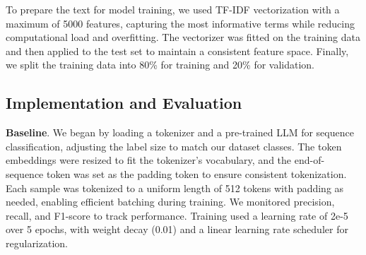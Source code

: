 \documentclass[runningheads]{llncs}
\begin{document}
To prepare the text for model training, we used TF-IDF vectorization with a maximum of 5000 features, capturing the most informative terms while reducing computational load and overfitting. The vectorizer was fitted on the training data and then applied to the test set to maintain a consistent feature space. Finally, we split the training data into 80\% for training and 20\% for validation.



\subsection{Implementation and Evaluation} %

\textbf{Baseline}. We began by loading a tokenizer and a pre-trained LLM for sequence classification, adjusting the label size to match our dataset classes. The token embeddings were resized to fit the tokenizer's vocabulary, and the end-of-sequence token was set as the padding token to ensure consistent tokenization. Each sample was tokenized to a uniform length of 512 tokens with padding as needed, enabling efficient batching during training. We monitored precision, recall, and F1-score to track performance. Training used a learning rate of 2e-5 over 5 epochs, with weight decay (0.01) and a linear learning rate scheduler for regularization.
\end{document}
